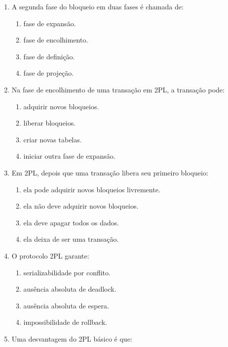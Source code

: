 \documentclass[12pt,a4paper]{article}
\begin{document}
\begin{enumerate}[label=\textbf{Q\arabic*.}]
\item A segunda fase do bloqueio em duas fases é chamada de:

\begin{enumerate}[label=\alph*)]
    \item fase de expansão.
    \item fase de encolhimento.
    \item fase de definição.
    \item fase de projeção.
\end{enumerate}

\item Na fase de encolhimento de uma transação em 2PL, a transação pode:

\begin{enumerate}[label=\alph*)]
    \item adquirir novos bloqueios.
    \item liberar bloqueios.
    \item criar novas tabelas.
    \item iniciar outra fase de expansão.
\end{enumerate}

\item Em 2PL, depois que uma transação libera seu primeiro bloqueio:

\begin{enumerate}[label=\alph*)]
    \item ela pode adquirir novos bloqueios livremente.
    \item ela não deve adquirir novos bloqueios.
    \item ela deve apagar todos os dados.
    \item ela deixa de ser uma transação.
\end{enumerate}

\item O protocolo 2PL garante:

\begin{enumerate}[label=\alph*)]
    \item serializabilidade por conflito.
    \item ausência absoluta de deadlock.
    \item ausência absoluta de espera.
    \item impossibilidade de rollback.
\end{enumerate}

\item Uma desvantagem do 2PL básico é que:


\end{enumerate}
\end{document}

